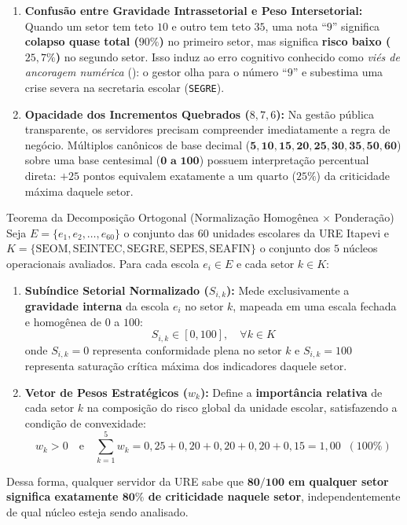 \documentclass[9pt,a4paper]{extarticle}
\begin{document}
\begin{enumerate}[leftmargin=1.5em, itemsep=4pt]
    \item \textbf{Confusão entre Gravidade Intrassetorial e Peso Intersetorial:} Quando um setor tem teto $10$ e outro tem teto $35$, uma nota ``$9$'' significa \textbf{colapso quase total ($90\%$)} no primeiro setor, mas significa \textbf{risco baixo ($25{,}7\%$)} no segundo setor. Isso induz ao erro cognitivo conhecido como \emph{viés de ancoragem numérica} (\cite{kahneman2011}): o gestor olha para o número ``$9$'' e subestima uma crise severa na secretaria escolar (\texttt{SEGRE}).
    \item \textbf{Opacidade dos Incrementos Quebrados ($8, 7, 6$):} Na gestão pública transparente, os servidores precisam compreender imediatamente a regra de negócio. Múltiplos canônicos de base decimal ($\mathbf{5, 10, 15, 20, 25, 30, 35, 50, 60}$) sobre uma base centesimal ($\mathbf{0\text{ a }100}$) possuem interpretação percentual direta: $+25$ pontos equivalem exatamente a um quarto ($25\%$) da criticidade máxima daquele setor.
\end{enumerate}

\begin{mathbox}{Teorema da Decomposição Ortogonal (Normalização Homogênea $\times$ Ponderação)}
Seja $E = \{e_1, e_2, \dots, e_{60}\}$ o conjunto das $60$ unidades escolares da URE Itapevi e $K = \{\text{SEOM}, \text{SEINTEC}, \text{SEGRE}, \text{SEPES}, \text{SEAFIN}\}$ o conjunto dos $5$ núcleos operacionais avaliados. Para cada escola $e_i \in E$ e cada setor $k \in K$:

\begin{enumerate}[leftmargin=1.5em]
    \item \textbf{Subíndice Setorial Normalizado ($S_{i,k}$):} Mede exclusivamente a \textbf{gravidade interna} da escola $e_i$ no setor $k$, mapeada em uma escala fechada e homogênea de $0$ a $100$:
    \begin{equation}
        S_{i,k} \in [0, 100], \quad \forall k \in K
    \end{equation}
    onde $S_{i,k} = 0$ representa conformidade plena no setor $k$ e $S_{i,k} = 100$ representa saturação crítica máxima dos indicadores daquele setor.
    \item \textbf{Vetor de Pesos Estratégicos ($w_k$):} Define a \textbf{importância relativa} de cada setor $k$ na composição do risco global da unidade escolar, satisfazendo a condição de convexidade:
    \begin{equation}
        w_k > 0 \quad \text{e} \quad \sum_{k=1}^{5} w_k = 0{,}25 + 0{,}20 + 0{,}20 + 0{,}20 + 0{,}15 = 1{,}00 \;\; (100\%)
    \end{equation}
\end{enumerate}
Dessa forma, qualquer servidor da URE sabe que \textbf{$\mathbf{80/100}$ em qualquer setor significa exatamente $\mathbf{80\%}$ de criticidade naquele setor}, independentemente de qual núcleo esteja sendo analisado.
\end{mathbox}
\end{document}
